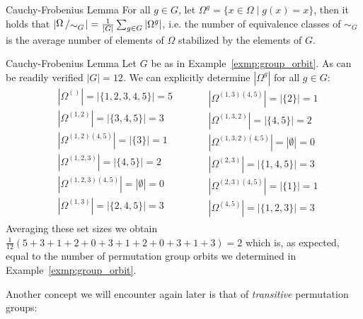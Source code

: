 \begin{lemma}{Cauchy-Frobenius Lemma}
  \label{lemma:cauchy_frobenius}
  For all $g \in G$, let $\Omega^g = \{x \in \Omega \mid g(x) = x\}$, then it
  holds that $|\bigslant{\Omega}{\sim_G}| = \frac{1}{|G|} \sum_{g \in G}
  |\Omega^g|$, i.e. the number of equivalence classes of $\sim_G$ is the average
  number of elements of $\Omega$ stabilized by the elements of $G$.
\end{lemma}

\begin{exmp}[label=exmp:cauchy_frobenius]{Cauchy-Frobenius Lemma}
  Let $G$ be as in Example~\ref{exmp:group_orbit}. As can be readily verified
  $|G| = 12$. We can explicitly determine $|\Omega^g|$ for all $g \in G$:
  \begin{equation*}
    \begin{split}
      &|\Omega^{()}|           = |\{1,2,3,4,5\}| = 5\\
      &|\Omega^{(1,2)}|        = |\{3,4,5\}|     = 3\\
      &|\Omega^{(1,2)(4,5)}|   = |\{3\}|         = 1\\
      &|\Omega^{(1,2,3)}|      = |\{4,5\}|       = 2\\
      &|\Omega^{(1,2,3)(4,5)}| = |\emptyset|     = 0\\
      &|\Omega^{(1,3)}|        = |\{2,4,5\}|     = 3\\
    \end{split}
    \qquad
    \begin{split}
      &|\Omega^{(1,3)(4,5)}|   = |\{2\}|         = 1\\
      &|\Omega^{(1,3,2)}|      = |\{4,5\}|       = 2\\
      &|\Omega^{(1,3,2)(4,5)}| = |\emptyset|     = 0\\
      &|\Omega^{(2,3)}|        = |\{1,4,5\}|     = 3\\
      &|\Omega^{(2,3)(4,5)}|   = |\{1\}|         = 1\\
      &|\Omega^{(4,5)}|        = |\{1,2,3\}|     = 3
    \end{split}
  \end{equation*}
  Averaging these set sizes we obtain $\frac{1}{12}(5+3+1+2+0+3+1+2+0+3+1+3) =
  2$ which is, as expected, equal to the number of permutation group orbits we
  determined in Example~\ref{exmp:group_orbit}.
\end{exmp}
%
Another concept we will encounter again later is that of \textit{transitive}
permutation groups:


